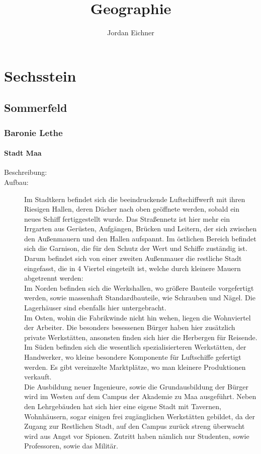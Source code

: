 \documentclass[a4paper,12pt,oneside]{book}
\title{Geographie}
\author{Jordan Eichner}
\date{}
\begin{document}
\maketitle
\tableofcontents

\part{Sechsstein}

\chapter{Sommerfeld}

\section{Baronie Lethe}

\subsection{Stadt Maa}
\begin{description}
\item[Beschreibung:]
\item[Aufbau:]Im Stadtkern befindet sich die beeindruckende Luftschiffwerft mit ihren Riesigen Hallen, deren Dächer nach oben geöffnete werden, sobald ein neues Schiff fertiggestellt wurde. Das Straßennetz ist hier mehr ein Irrgarten aus Gerüsten, Aufgängen, Brücken und Leitern, der sich zwischen den Außenmauern und den Hallen aufspannt. Im östlichen Bereich befindet sich die Garnison, die für den Schutz der Wert und Schiffe zuständig ist.
\\Darum befindet sich von einer zweiten Außenmauer die restliche Stadt eingefasst, die in 4 Viertel eingeteilt ist, welche durch kleinere Mauern abgetrennt werden:
\\Im Norden befinden sich die Werkshallen, wo größere Bauteile vorgefertigt werden, sowie massenhaft Standardbauteile, wie Schrauben und Nägel. Die Lagerhäuser sind ebenfalls hier untergebracht.
\\Im Osten, wohin die Fabrikwinde nicht hin wehen, liegen die Wohnviertel der Arbeiter. Die besonders besessenen Bürger haben hier zusätzlich private Werkstätten, ansonsten finden sich hier die Herbergen für Reisende.
\\Im Süden befinden sich die wesentlich spezialisierteren Werkstätten, der Handwerker, wo kleine besondere Komponente für Luftschiffe gefertigt werden. Es gibt vereinzelte Marktplätze, wo man kleinere Produktionen verkauft.
\\Die Ausbildung neuer Ingenieure, sowie die Grundausbildung der Bürger wird im Westen auf dem Campus der Akademie zu Maa ausgeführt. Neben den Lehrgebäuden hat sich hier eine eigene Stadt mit Tavernen, Wohnhäusern, sogar einigen frei zugänglichen Werkstätten gebildet, da der Zugang zur Restlichen Stadt, auf den Campus zurück streng überwacht wird aus Angst vor Spionen. Zutritt haben nämlich nur Studenten, sowie Professoren, sowie das Militär.
\end{description}
\end{document}
